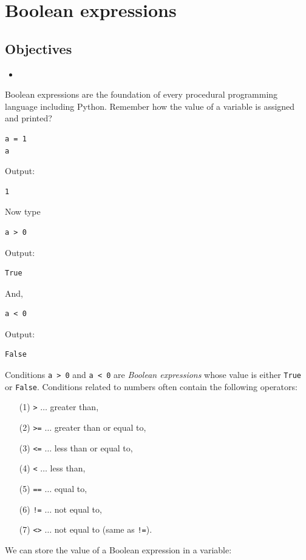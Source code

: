 \section{Boolean expressions}

\subsection{Objectives}

\begin{itemize}
\item
\end{itemize}

Boolean expressions are the foundation of every procedural programming 
language including Python. Remember how the value of a variable 
is assigned and printed? 

\begin{verbatim}
a = 1
a
\end{verbatim}
Output:

\begin{verbatim}
1
\end{verbatim}
Now type

\begin{verbatim}
a > 0
\end{verbatim}
Output:

\begin{verbatim}
True
\end{verbatim}
And,

\begin{verbatim}
a < 0
\end{verbatim}
Output:

\begin{verbatim}
False
\end{verbatim}
Conditions {\tt a > 0} and {\tt a < 0} are {\em Boolean expressions} whose value is either 
{\tt True} or {\tt False}. Conditions related to numbers often contain the following operators:

\begin{itemize}
\item[(1)] {\tt >} {$\ldots$} greater than, 
\item[(2)] {\tt >=} {$\ldots$} greater than or equal to, 
\item[(3)] {\tt <=} {$\ldots$} less than or equal to, 
\item[(4)] {\tt <} {$\ldots$} less than, 
\item[(5)] {\tt ==} {$\ldots$} equal to, 
\item[(6)] {\tt !=} {$\ldots$} not equal to, 
\item[(7)] {\tt <>} {$\ldots$} not equal to (same as {\tt !=}).
\end{itemize}
We can store the value of a Boolean expression in a variable:

